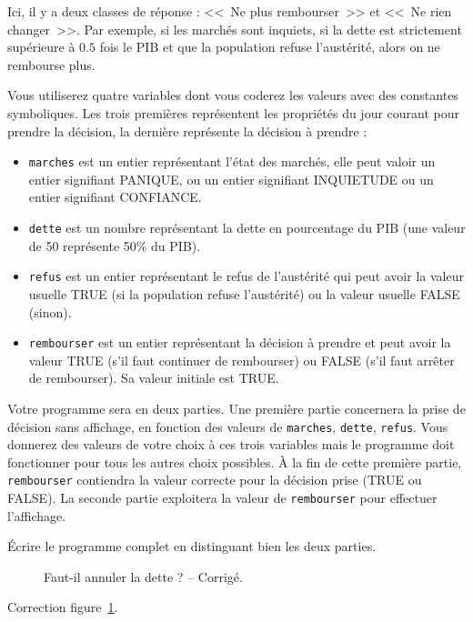 Ici, il y a deux classes de réponse : <<~Ne plus rembourser~>> et
<<~Ne rien changer~>>.
Par exemple, si les marchés sont inquiets, si la dette est
strictement supérieure à $0.5$ fois le PIB et que la population refuse
l'austérité, alors on ne rembourse plus.


Vous utiliserez quatre variables dont vous coderez les valeurs avec des
constantes symboliques. Les trois premières représentent les propriétés du jour
courant pour prendre la décision, la dernière représente la décision à
prendre :
  
\begin{itemize}
\item \verb|marches| est un entier représentant l'état des marchés,
  elle peut valoir un entier signifiant PANIQUE, ou un entier
  signifiant INQUIETUDE ou un entier signifiant CONFIANCE.
\item \verb|dette| est un nombre représentant la dette en
  pourcentage du PIB (une valeur de 50 représente 50\% du PIB).
\item \verb|refus| est un entier représentant le refus de l'austérité
  qui peut avoir la valeur usuelle
 TRUE (si la population refuse l'austérité) ou la valeur usuelle FALSE (sinon).
\item \verb|rembourser| est un entier représentant la décision à
  prendre et peut avoir la valeur TRUE (s'il faut continuer de
  rembourser) ou FALSE (s'il faut arrêter de rembourser). Sa valeur
  initiale est TRUE. 
\end{itemize}

Votre programme sera en deux parties. Une première partie concernera
la prise de décision sans affichage, en fonction
des valeurs de \verb|marches|, \verb|dette|, \verb|refus|. Vous
donnerez des valeurs de votre choix à ces trois variables mais le
programme doit fonctionner pour tous les autres choix possibles. À la fin
de cette première partie, \verb|rembourser| contiendra la valeur
correcte pour la décision prise (TRUE ou FALSE). La seconde partie
exploitera la valeur de \verb|rembourser| pour effectuer l'affichage.

Écrire le programme complet en distinguant bien les deux
parties.

\begin{correction}
\begin{figure}
  \centering
\begin{small}
\end{small} 
  \caption{Faut-il annuler la dette ? -- Corrigé.}
  \label{fig:dropdebt}
\end{figure}
Correction figure~\ref{fig:dropdebt}.
\end{correction}

